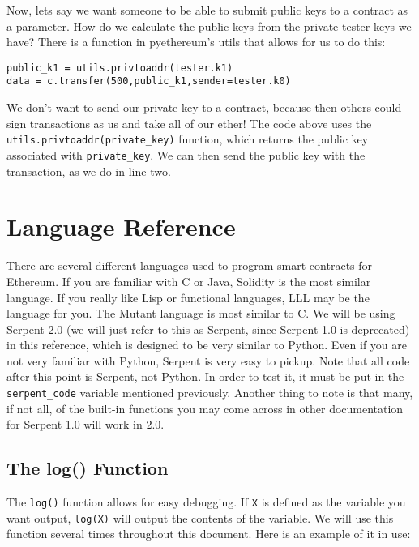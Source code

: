 \documentclass[12pt]{article}
\begin{document}
Now, lets say we want someone to be able to submit public keys to a contract as a parameter. How do we calculate the public keys from the private tester keys we have? There is a function in pyethereum's utils that allows for us to do this:

\begin{verbatim}
public_k1 = utils.privtoaddr(tester.k1)
data = c.transfer(500,public_k1,sender=tester.k0)
\end{verbatim}

We don't want to send our private key to a contract, because then others could sign transactions as us and take all of our ether! The code above uses the \texttt{utils.privtoaddr(private\_key)} function, which returns the public key associated with \texttt{private\_key}. We can then send the public key with the transaction, as we do in line two.




\section{Language Reference}

There are several different languages used to program smart contracts for Ethereum. If you are familiar with C or Java, Solidity is the most similar language. If you really like Lisp or functional languages, LLL may be the language for you. The Mutant language is most similar to C. We will be using Serpent 2.0 (we will just refer to this as Serpent, since Serpent 1.0 is deprecated) in this reference, which is designed to be very similar to Python. Even if you are not very familiar with Python, Serpent is very easy to pickup. Note that all code after this point is Serpent, not Python. In order to test it, it must be put in the \texttt{serpent\_code} variable mentioned previously. Another thing to note is that many, if not all, of the built-in functions you may come across in other documentation for Serpent 1.0 will work in 2.0.

\subsection{The log() Function}

The \texttt{log()} function allows for easy debugging. If \texttt{X} is defined as the variable you want output, \texttt{log(X)} will output the contents of the variable. We will use this function several times throughout this document. Here is an example of it in use:
\end{document}
